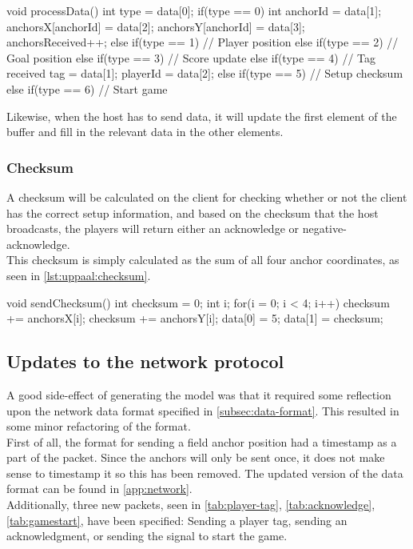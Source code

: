 \begin{uppaalcode}[caption={Processing Data in \uppaal model}, captionpos=b,label={lst:uppaal:processData},numbers=left]
void processData(){
    int type = data[0];
    if(type == 0){
        int anchorId = data[1];
        anchorsX[anchorId] = data[2];
        anchorsY[anchorId] = data[3];
        anchorsReceived++;
    } else if(type == 1){
        // Player position
    } else if(type == 2){
        // Goal position
    } else if(type == 3){
        // Score update
    } else if(type == 4){
        // Tag received
        tag = data[1];
        playerId = data[2];
    } else if(type == 5){
        // Setup checksum
    } else if(type == 6){
        // Start game
    }
}
\end{uppaalcode}
\noindent
Likewise, when the host has to send data, it will update the first element of the buffer and fill in the relevant data in the other elements.

\subsubsection{Checksum}
A checksum will be calculated on the client for checking whether or not the client has the correct setup information, and based on the checksum that the host broadcasts, the players will return either an acknowledge or negative-acknowledge.
\\
This checksum is simply calculated as the sum of all four anchor coordinates, as seen in \autoref{lst:uppaal:checksum}.

\begin{uppaalcode}[caption={Calculating checksum in \uppaal model}, captionpos=b,label={lst:uppaal:checksum}]
void sendChecksum(){
    int checksum = 0;
    int i;
    for(i = 0; i < 4; i++){
        checksum += anchorsX[i];
        checksum += anchorsY[i];
    }
    data[0] = 5;
    data[1] = checksum;
}
\end{uppaalcode}

\subsection{Updates to the network protocol}\label{subsec:sprint3networkupdate}
A good side-effect of generating the \uppaal model was that it required some reflection upon the network data format specified in \autoref{subsec:data-format}.
This resulted in some minor refactoring of the format.
\\
First of all, the format for sending a field anchor position had a timestamp as a part of the packet.
Since the anchors will only be sent once, it does not make sense to timestamp it so this has been removed.
The updated version of the data format can be found in \autoref{app:network}.
\\
Additionally, three new packets, seen in \autoref{tab:player-tag}, \autoref{tab:acknowledge}, \autoref{tab:gamestart}, have been specified: Sending a player tag, sending an acknowledgment, or sending the signal to start the game.


